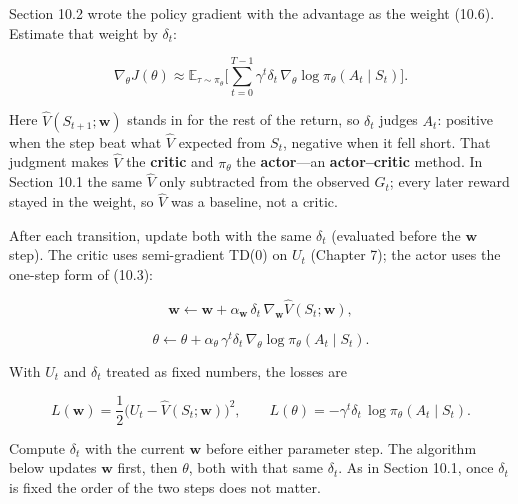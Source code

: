 Section 10.2 wrote the policy gradient with the advantage as the weight (10.6). Estimate that weight by $\delta_t$:

\begin{equation}
\nabla_\theta J(\theta)
\approx
\mathbb{E}_{\tau\sim\pi_\theta}\Biggl[
\sum_{t=0}^{T-1}
\gamma^{t}\delta_t\,\nabla_\theta\log\pi_\theta(A_t\mid S_t)
\Biggr].
\tag{10.7a}
\end{equation}

Here $\hat{V}(S_{t+1};\mathbf{w})$ stands in for the rest of the return, so $\delta_t$ judges $A_t$: positive when the step beat what $\hat{V}$ expected from $S_t$, negative when it fell short. That judgment makes $\hat{V}$ the \textbf{critic} and $\pi_\theta$ the \textbf{actor}---an \textbf{actor--critic} method. In Section 10.1 the same $\hat{V}$ only subtracted from the observed $G_t$; every later reward stayed in the weight, so $\hat{V}$ was a baseline, not a critic.

After each transition, update both with the same $\delta_t$ (evaluated before the $\mathbf{w}$ step). The critic uses semi-gradient TD(0) on $U_t$ (Chapter 7); the actor uses the one-step form of (10.3):

\begin{equation}
\mathbf{w}
\leftarrow
\mathbf{w}
+
\alpha_{\mathbf{w}}\,
\delta_t\,
\nabla_{\mathbf{w}}\hat{V}(S_t;\mathbf{w}),
\tag{10.8}
\end{equation}

\begin{equation}
\theta
\leftarrow
\theta
+
\alpha_\theta\,
\gamma^{t}\delta_t\,
\nabla_\theta\log\pi_\theta(A_t\mid S_t).
\tag{10.9}
\end{equation}

With $U_t$ and $\delta_t$ treated as fixed numbers, the losses are

\begin{equation}
L(\mathbf{w})
=
\frac12\bigl(U_t-\hat{V}(S_t;\mathbf{w})\bigr)^2,
\qquad
L(\theta)
=
-\gamma^{t}\delta_t\,\log\pi_\theta(A_t\mid S_t).
\tag{10.10}
\end{equation}

Compute $\delta_t$ with the current $\mathbf{w}$ before either parameter step. The algorithm below updates $\mathbf{w}$ first, then $\theta$, both with that same $\delta_t$. As in Section 10.1, once $\delta_t$ is fixed the order of the two steps does not matter.

